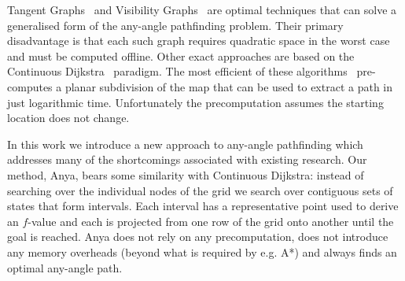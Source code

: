 %
%
Tangent Graphs~\cite{liu92} and Visibility Graphs~\cite{lozanoperez79} are 
optimal techniques that can solve a generalised form of the any-angle pathfinding 
problem. Their primary disadvantage is that each such graph requires quadratic 
space in the worst case and must be computed offline.
Other exact approaches are based on the 
Continuous Dijkstra~\cite{mitchell87} paradigm.
The most efficient of these algorithms~\cite{hershberger99} pre-computes a 
planar subdivision of the map that can be used to extract a path in just
logarithmic time. Unfortunately the precomputation assumes the starting location
does not change.

In this work we introduce a new approach to any-angle pathfinding 
which addresses many of the shortcomings associated with existing research.
Our method, Anya, bears some similarity with Continuous Dijkstra: 
instead of searching over the individual nodes of the grid we 
search over contiguous sets of states that form intervals.
Each interval has a representative point used to derive an $f$-value
and each is projected from one row of the grid onto another until the 
goal is reached.
Anya does not rely on any precomputation, does not introduce any
memory overheads (beyond what is required by e.g. A*) and always finds 
an optimal any-angle path.

